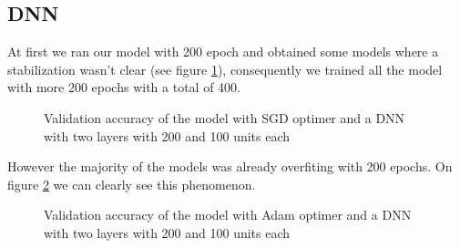 \documentclass[journal, a4paper]{IEEEtran}
\begin{document}
    \subsection{DNN}
    At first we ran our model with 200 epoch and obtained some models where
  a stabilization wasn't clear (see figure \ref{fig:sgd_200_100}), consequently we 
trained all the model with more 200 epochs with a total of 400.

    \begin{figure}
      \caption{Validation accuracy of the model with SGD optimer and
      a DNN with two layers with 200 and 100 units each}
      \label{fig:sgd_200_100}
    \end{figure}

    However the majority of the models was already overfiting with 200
epochs. On figure \ref{fig:adam_200_100} we can clearly see this
phenomenon.

    \begin{figure}
      \caption{Validation accuracy of the model with Adam optimer and
      a DNN with two layers with 200 and 100 units each}
      \label{fig:adam_200_100}
    \end{figure}
\end{document}
